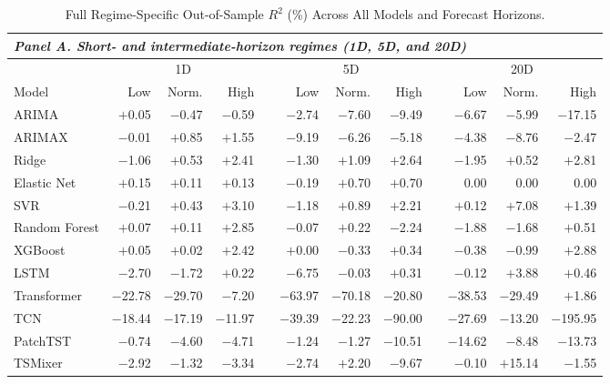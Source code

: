 \documentclass[runningheads,orivec]{llncs}
\begin{document}
\begin{table}[htbp]
\centering
\caption{Full Regime-Specific Out-of-Sample $R^2$ (\%) Across All Models and Forecast Horizons.}\label{tab:full_regime_oos_r2}
{\footnotesize
\setlength{\tabcolsep}{1.8pt}
\begin{tabular}{lrrr@{\hspace{3pt}}c@{\hspace{3pt}}rrr@{\hspace{3pt}}c@{\hspace{3pt}}rrr}
\hline
\multicolumn{12}{l}{\textit{Panel A. Short- and intermediate-horizon regimes (1D, 5D, and 20D)}} \\
\hline
 & \multicolumn{3}{c}{1D} & & \multicolumn{3}{c}{5D} & & \multicolumn{3}{c}{20D} \\
\cline{2-4}\cline{6-8}\cline{10-12}
Model & Low & Norm. & High & & Low & Norm. & High & & Low & Norm. & High \\
\hline
ARIMA         & $+$0.05  & $-$0.47  & $-$0.59  & & $-$2.74  & $-$7.60  & $-$9.49  & & $-$6.67  & $-$5.99  & $-$17.15 \\
ARIMAX        & $-$0.01  & $+$0.85  & $+$1.55  & & $-$9.19  & $-$6.26  & $-$5.18  & & $-$4.38  & $-$8.76  & $-$2.47 \\
Ridge         & $-$1.06  & $+$0.53  & $+$2.41  & & $-$1.30  & $+$1.09  & $+$2.64  & & $-$1.95  & $+$0.52  & $+$2.81 \\
Elastic Net   & $+$0.15  & $+$0.11  & $+$0.13  & & $-$0.19  & $+$0.70  & $+$0.70  & & 0.00     & 0.00     & 0.00 \\
SVR           & $-$0.21  & $+$0.43  & $+$3.10  & & $-$1.18  & $+$0.89  & $+$2.21  & & $+$0.12  & $+$7.08  & $+$1.39 \\
Random Forest & $+$0.07  & $+$0.11  & $+$2.85  & & $-$0.07  & $+$0.22  & $-$2.24  & & $-$1.88  & $-$1.68  & $+$0.51 \\
XGBoost       & $+$0.05  & $+$0.02  & $+$2.42  & & $+$0.00  & $-$0.33  & $+$0.34  & & $-$0.38  & $-$0.99  & $+$2.88 \\
LSTM          & $-$2.70  & $-$1.72  & $+$0.22  & & $-$6.75  & $-$0.03  & $+$0.31  & & $-$0.12  & $+$3.88  & $+$0.46 \\
Transformer   & $-$22.78 & $-$29.70 & $-$7.20  & & $-$63.97 & $-$70.18 & $-$20.80 & & $-$38.53 & $-$29.49 & $+$1.86 \\
TCN           & $-$18.44 & $-$17.19 & $-$11.97 & & $-$39.39 & $-$22.23 & $-$90.00 & & $-$27.69 & $-$13.20 & $-$195.95 \\
PatchTST      & $-$0.74  & $-$4.60  & $-$4.71  & & $-$1.24  & $-$1.27  & $-$10.51 & & $-$14.62 & $-$8.48  & $-$13.73 \\
TSMixer       & $-$2.92  & $-$1.32  & $-$3.34  & & $-$2.74  & $+$2.20  & $-$9.67  & & $-$0.10  & $+$15.14 & $-$1.55 \\
\hline
\end{tabular}

}
\end{table}
\end{document}
